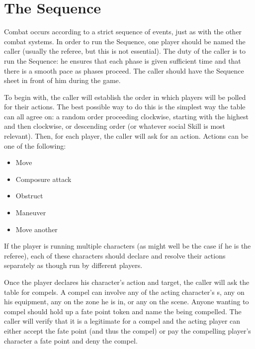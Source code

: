 \section{The Sequence}\label{sec:social-combat-sequence}

Combat occurs according to a strict sequence of events, just as with the other combat systems. In order to run the Sequence, one player should be named the caller (usually the referee, but this is not essential). The duty of the caller is to run the Sequence: he ensures that each phase is given sufficient time and that there is a smooth pace as phases proceed. The caller should have the Sequence sheet in front of him during the game.



To begin with, the caller will establish the order in which players will be polled for their actions. The best possible way to do this is the simplest way the table can all agree on: a random order proceeding clockwise, starting with the highest  and then clockwise, or descending order  (or whatever social Skill is most relevant). Then, for each player, the caller will ask for an action. Actions can be one of the following:

\begin{itemize}
\item Move
\item Composure attack
\item Obstruct
\item Maneuver
\item Move another
\end{itemize}

If the player is running multiple characters (as might well be the case if he is the referee), each of these characters should declare and resolve their actions separately as though run by different players.

Once the player declares his character's action and target, the caller will ask the table for compels. A compel can involve any of the acting character's \Aspect{}s, any \Aspect{} on his equipment, any \Aspect{} on the zone he is in, or any \Aspect{} on the scene. Anyone wanting to compel should hold up a fate point token and name the \Aspect{} being compelled. The caller will verify that it is a legitimate \Aspect{} for a compel and the acting player can either accept the fate point (and thus the compel) or pay the compelling player's character a fate point and deny the compel.

